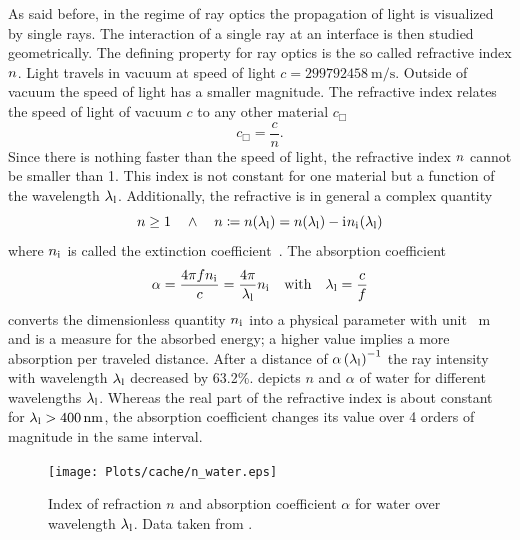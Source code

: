As said before, in the regime of ray optics the propagation of light is 
visualized by single rays. The interaction of a single ray at an interface is 
then studied geometrically. The defining property for ray optics is the so 
called refractive index $n$. Light travels in vacuum at speed of 
light $c=\SI{299792458}{\m\per\s}$. Outside of vacuum the speed of light has a 
smaller magnitude. The refractive index relates the speed of light of vacuum 
$c$ to any other material $c_{\Box}$
\begin{equation}
  c_{\Box} = \frac{c}{n}.
  \label{eq:TO-lightspeed}
\end{equation}
Since there is nothing faster than the speed of light, the refractive index 
$n$ cannot be smaller than 1. This index is not constant for one 
material but a function of the wavelength $\lambda_{\mathrm{l}}$. Additionally, the 
refractive is in general a complex quantity
\begin{equation}
  n\geq 1 \quad \wedge \quad n \coloneqq 
  n(\lambda_{\mathrm{l}}) = n(\lambda_{\mathrm{l}}) - \mathrm{i}\mkern1mu n_{\mathrm{i}\mkern1mu}(\lambda_{\mathrm{l}})
  \label{eq:TO-refractive-index}
\end{equation}
where $n_{\mathrm{i}\mkern1mu}$ is called the extinction 
coefficient~\cite{Jackson2013}. The absorption coefficient~\cite{Hecht2017}
\begin{equation}
  \alpha = \frac{4\pi f n_{\mathrm{i}\mkern1mu}}{c} = 
  \frac{4\pi}{\lambda_{\mathrm{l}}}n_{\mathrm{i}\mkern1mu}\quad\text{with}\quad\lambda_{\mathrm{l}}=\frac{c}{f}
  \label{eq:TO-alpha}
\end{equation}
converts the dimensionless quantity $n_{\mathrm{i}\mkern1mu}$ into a physical 
parameter with unit \si{\per\meter} and is a measure for the absorbed energy; a 
higher value implies a more absorption per traveled distance. After a distance 
of $\alpha\left(\lambda_{\mathrm{l}}\right)^{-1}$ the ray intensity with wavelength $\lambda_{\mathrm{l}}$ 
decreased by 63.2\%.  depicts $n$ and $\alpha$ of water 
for different wavelengths $\lambda_{\mathrm{l}}$. Whereas the real part of the refractive index 
is about constant for $\lal > \SI{400}{\nm}$, the absorption coefficient 
changes its value over 4 orders of magnitude in the same interval.

\begin{figure}[tbp]
  \centering
  \texttt{[image: Plots/cache/n\_water.eps]}
  \caption{Index of refraction $n$ and absorption coefficient $\alpha$ for 
  water over wavelength $\lambda_{\mathrm{l}}$. Data taken from 
\cite{Hale1973,Segelstein1981}.}
  \label{fig:TO-n_water}
\end{figure}


